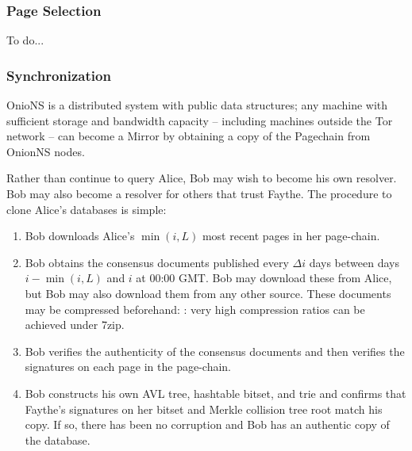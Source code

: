 
\subsubsection{Page Selection}

To do...

\subsubsection{Synchronization}

OnioNS is a distributed system with public data structures; any machine with sufficient storage and bandwidth capacity -- including machines outside the Tor network -- can become a Mirror by obtaining a copy of the Pagechain from OnionNS nodes.

Rather than continue to query Alice, Bob may wish to become his own resolver. Bob may also become a resolver for others that trust Faythe. The procedure to clone Alice's databases is simple:

\begin{enumerate}
	\item Bob downloads Alice's $ \min(i,L) $ most recent pages in her page-chain.
	\item Bob obtains the consensus documents published every $ \Delta i $ days between days $ i - \min(i,L) $ and $ i $ at 00:00 GMT. Bob may download these from Alice, but Bob may also download them from any other source. These documents may be compressed beforehand: : very high compression ratios can be achieved under 7zip.
	\item Bob verifies the authenticity of the consensus documents and then verifies the signatures on each page in the page-chain.
	\item Bob constructs his own AVL tree, hashtable bitset, and trie and confirms that Faythe's signatures on her bitset and Merkle collision tree root match his copy. If so, there has been no corruption and Bob has an authentic copy of the database.
\end{enumerate}

